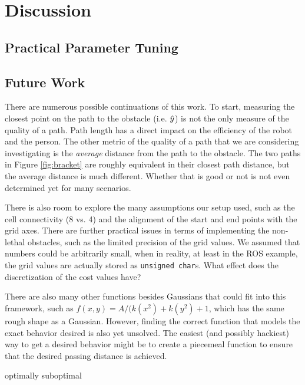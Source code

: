 \section{Discussion}
\subsection{Practical Parameter Tuning}
\subsection{Future Work}
There are numerous possible continuations of this work. To start, measuring the closest point on the path to the obstacle (i.e. $\hat{y}$) is not the only measure of the quality of a path. Path length has a direct impact on the efficiency of the robot and the person. The other metric of the quality of a path that we are considering investigating is the \emph{average} distance from the path to the obstacle. The two paths in Figure \ref{fig:bracket} are roughly equivalent in their closest path distance, but the average distance is much different. Whether that is good or not is not even determined yet for many scenarios. 

There is also room to explore the many assumptions our setup used, such as the cell connectivity (8 vs. 4) and the alignment of the start and end points with the grid axes. There are further practical issues in terms of implementing the non-lethal obstacles, such as the limited precision of the grid values. We assumed that numbers could be arbitrarily small, when in reality, at least in the ROS example, the grid values are actually stored as \texttt{unsigned char}s. What effect does the discretization of the cost values have? 

There are also many other functions besides Gaussians that could fit into this framework, such as $f(x,y) = A/(k(x^2) + k(y^2) + 1$, which has the same rough shape as a Gaussian. However, finding the correct function that models the exact behavior desired is also yet unsolved. The easiest (and possibly hackiest) way to get a desired behavior might be to create a piecemeal function to ensure that the desired passing distance is achieved. 


optimally suboptimal

